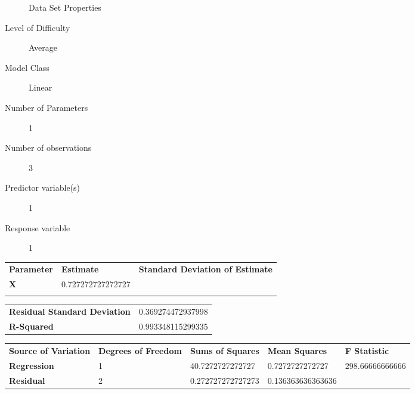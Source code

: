 \documentclass[10pt]{article}
\begin{document}
\begin{description}
   \item[]Data Set Properties
   \item[Level of Difficulty]Average
   \item[Model Class]Linear
   \item[Number of Parameters]1
   \item[Number of observations]3
   \item[Predictor variable(s)]1
   \item[Response variable]1
\end{description}

\begin{tabular}{lll}
   \textbf{Parameter} & \textbf{Estimate} & \textbf{Standard Deviation of Estimate}  \\ 
	\textbf{X} &   0.727272727272727 &   \\ 
	  &   &  \\ 
\end{tabular} 

\begin{tabular}{ll}
    \textbf{Residual Standard Deviation} & 0.369274472937998    \\ 
    \textbf{R-Squared} & 0.993348115299335   \\  
\end{tabular}


\begin{tabular}{lllll}
   \textbf{Source of Variation} & \textbf{Degrees of Freedom} & \textbf{Sums of Squares} & \textbf{Mean Squares}  & \textbf{F Statistic} \\ 
   \textbf{Regression} & 1 & 40.7272727272727 & 0.7272727272727 & 298.66666666666 \\ 
	\textbf{Residual} & 2 & 0.272727272727273 & 0.136363636363636  \\ 
\end{tabular} 
\end{document}
